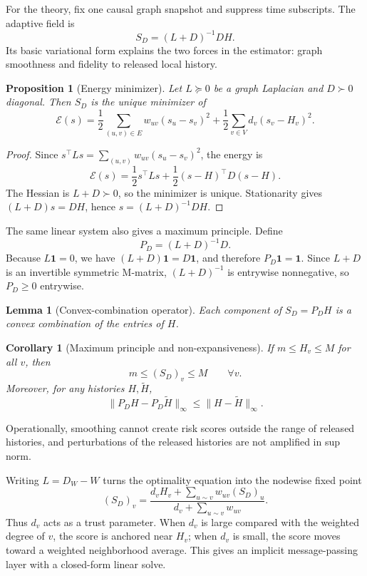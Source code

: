 \documentclass[11pt]{article}
\newtheorem{proposition}[theorem]{Proposition}
\newtheorem{lemma}[theorem]{Lemma}
\newtheorem{corollary}[theorem]{Corollary}
\theoremstyle{definition}
\theoremstyle{remark}
\newcommand{\one}{\mathbf{1}}
\newcommand{\calE}{\mathcal{E}}
\newcommand{\SD}{S_D}
\begin{document}
For the theory, fix one causal graph snapshot and suppress time subscripts. The adaptive field is
\[
    \SD=(L+D)^{-1}DH.
\]
Its basic variational form explains the two forces in the estimator: graph smoothness and fidelity to released local history.

\begin{proposition}[Energy minimizer]
Let $L\succeq0$ be a graph Laplacian and $D\succ0$ diagonal. Then $\SD$ is the unique minimizer of
\begin{equation}
    \calE(s)=\frac12\sum_{(u,v)\in E}w_{uv}(s_u-s_v)^2
    +\frac12\sum_{v\in V}d_v(s_v-H_v)^2.
    \label{eq:energy}
\end{equation}
\end{proposition}

\begin{proof}
Since $s^\top Ls=\sum_{(u,v)}w_{uv}(s_u-s_v)^2$, the energy is
\[
    \calE(s)=\frac12s^\top Ls+\frac12(s-H)^\top D(s-H).
\]
The Hessian is $L+D\succ0$, so the minimizer is unique. Stationarity gives $(L+D)s=DH$, hence $s=(L+D)^{-1}DH$.
\end{proof}

The same linear system also gives a maximum principle. Define
\[
    P_D=(L+D)^{-1}D.
\]
Because $L\one=0$, we have $(L+D)\one=D\one$, and therefore $P_D\one=\one$. Since $L+D$ is an invertible symmetric M-matrix, $(L+D)^{-1}$ is entrywise nonnegative, so $P_D\ge0$ entrywise.

\begin{lemma}[Convex-combination operator]
Each component of $\SD=P_DH$ is a convex combination of the entries of $H$.
\end{lemma}

\begin{corollary}[Maximum principle and non-expansiveness]
If $m\le H_v\le M$ for all $v$, then
\[
    m\le (\SD)_v\le M\qquad \forall v.
\]
Moreover, for any histories $H,\widetilde H$,
\[
    \|P_DH-P_D\widetilde H\|_\infty\le \|H-\widetilde H\|_\infty.
\]
\end{corollary}

Operationally, smoothing cannot create risk scores outside the range of released histories, and perturbations of the released histories are not amplified in sup norm.

Writing $L=D_W-W$ turns the optimality equation into the nodewise fixed point
\begin{equation}
    (\SD)_v=\frac{d_vH_v+\sum_{u\sim v}w_{uv}(\SD)_u}{d_v+\sum_{u\sim v}w_{uv}}.
    \label{eq:nodewise}
\end{equation}
Thus $d_v$ acts as a trust parameter. When $d_v$ is large compared with the weighted degree of $v$, the score is anchored near $H_v$; when $d_v$ is small, the score moves toward a weighted neighborhood average. This gives an implicit message-passing layer with a closed-form linear solve.
\end{document}
